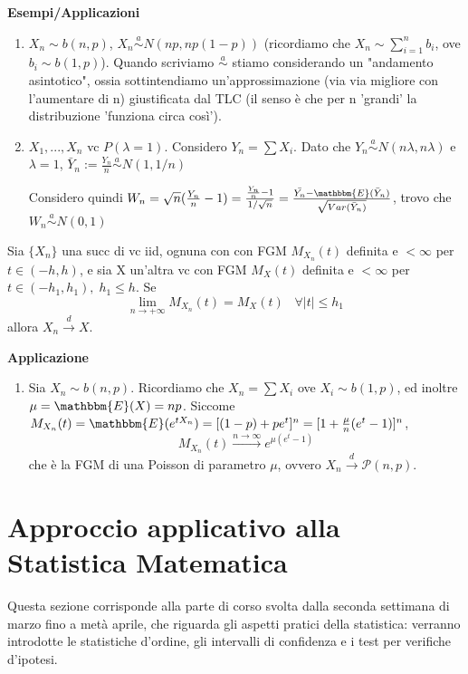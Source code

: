 \noindent\textbf{Esempi/Applicazioni}
\begin{enumerate}
\item $X_n \sim b(n,p)$, $X_n \stackrel{a}{\sim}N(np,np(1-p))$ (ricordiamo che $X_n \sim \sum_{i=1}^n b_i$, ove $b_i \sim b(1,p)$).
Quando scriviamo $\stackrel{a}{\sim}$ stiamo considerando un "andamento asintotico", ossia sottintendiamo un'approssimazione (via via migliore con l'aumentare di n) giustificata dal TLC (il senso è che per n 'grandi' la distribuzione 'funziona circa così').
\item $X_1,...,X_n$ vc 
$P(\lambda =1)$. 
Considero $Y_n=\sum X_i$.
Dato che $Y_n \stackrel{a}
{\sim} N(n\lambda ,n \lambda )$ e $\lambda=1$,
 $\bar{Y}_n:=\frac{Y_n}{n} \stackrel{a}
 {\sim} N(1,1/n)$

 Considero quindi $W_n=\sqrt{n}(\frac{Y_n}{n}-1)=\frac{\frac{Y_n}{n}-1}
{1/\sqrt{n}}=\frac{\bar{Y_n} - \mathbbm{E}(\bar{Y}_n)}
{\sqrt{Var(\bar{Y}_n)}}$, trovo che $W_n \stackrel{a}{\sim} N(0,1) $
\end{enumerate}

\begin{teo}
Sia $\{X_n\}$ una succ di vc iid, ognuna con con FGM $M_{X_n}(t)$ definita e $<\infty$ per $t\in(-h,h)$, e sia X un'altra vc con FGM $M_X(t)$ definita e $<\infty$ per $t \in (-h_1,h_1), \; h_1\leq h$. Se $$\lim_{n \rightarrow +\infty} M_{X_n}(t)=M_X(t) \; \; \; \forall |t| \leq h_1$$ allora $X_n \stackrel{d}{\rightarrow} X$.
\end{teo}

\noindent\textbf{Applicazione}

\begin{enumerate}
\item Sia $X_n \sim b(n,p)$. 
Ricordiamo che $X_n=\sum X_i$ ove $X_i \sim b(1,p)$, ed inoltre $\mu=\mathbbm{E}(X)=np$.
Siccome $M_{X_n}(t)=
\mathbbm{E}(e^{tX_n})=[(1-p)+pe^t]^n=
[1+\frac{\mu}{n}(e^t - 1)]^n$, 
$$ M_{X_n}(t) \stackrel{n \rightarrow \infty}{\longrightarrow} 
e^{\mu(e^t-1)}$$
che è la FGM di una Poisson di parametro $\mu$, ovvero $X_n \stackrel{d}{\rightarrow} \mathcal{P}(n,p).$
\end{enumerate}
\newpage

\chapter{Approccio applicativo alla Statistica Matematica}
Questa sezione corrisponde alla parte di corso svolta dalla seconda settimana di marzo fino a metà aprile, che riguarda gli aspetti pratici della statistica: verranno introdotte le statistiche d'ordine, gli intervalli di confidenza e i test per verifiche d'ipotesi.

